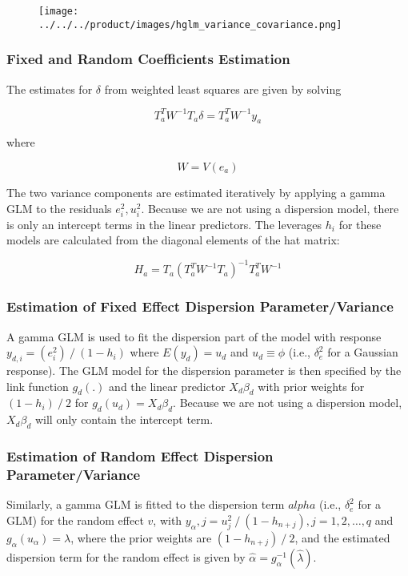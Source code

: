 \begin{figure}[H]
\centering
\texttt{[image: ../../../product/images/hglm\_variance\_covariance.png]}
\end{figure}

\subsubsection{Fixed and Random Coefficients Estimation}

The estimates for $\delta$ from weighted least squares are given by solving

$$T_a^T W^{-1} T_a \delta=T_a^T W^{-1} y_a$$

where

$$W= V(e_a )$$

The two variance components are estimated iteratively by applying a gamma GLM to the residuals $e_i^2,u_i^2$. Because we are not using a dispersion model, there is only an intercept terms in the linear predictors. The leverages $h_i$ for these models are calculated from the diagonal elements of the hat matrix:

$$H_a=T_a (T_a^T W^{-1} T_a )^{-1} T_a^T W^{-1}$$

\subsubsection{Estimation of Fixed Effect Dispersion Parameter/Variance}

A gamma GLM is used to fit the dispersion part of the model with response $y_{d,i}=(e_i^2)⁄(1-h_i )$ where $E(y_d )=u_d$ and $u_d\equiv \phi$ (i.e., $\delta_e^2$ for a Gaussian response). The GLM model for the dispersion parameter is then specified by the link function $g_d (.)$ and the linear predictor $X_d \beta_d$ with prior weights for $(1-h_i )⁄2$ for $g_d (u_d )=X_d \beta_d$. Because we are not using a dispersion model, $X_d \beta_d$ will only contain the intercept term.

\subsubsection{Estimation of Random Effect Dispersion Parameter/Variance}

Similarly, a gamma GLM is fitted to the dispersion term $alpha$ (i.e., $\delta_e^2$ for a GLM) for the random effect $v$, with $y_\alpha,j = u_j^2⁄(1-h_{n+j}), j=1,2,\ldots ,q$ and $g_\alpha (u_\alpha )=\lambda$, where the prior weights are $(1-h_{n+j} )⁄2$, and the estimated dispersion term for the random effect is given by $\hat \alpha = g_\alpha ^{-1}(\hat \lambda)$.

